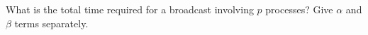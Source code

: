   \label{ex:latencylinear}
  What is the total time required for a broadcast involving $p$
  processes?
  Give $\alpha$ and $\beta$ terms separately.
